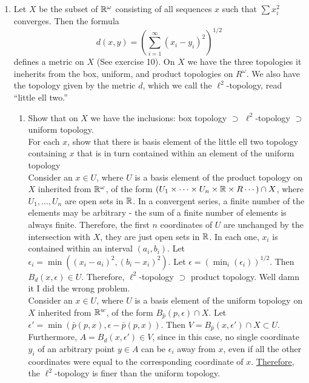 \documentclass[12pt,letterpaper]{article}
\begin{document}
\begin{enumerate}
  \item Let $X$ be the subset of $\mathbb{R}^\omega$ consisting of all sequences $x$ such that $\sum x_i^2$ converges. Then the formula $$d(x,y) = \left(\sum_{i=1}^\infty (x_i-y_i)^2\right)^{1/2}$$ defines a metric on $X$ (See exercise 10). On $X$ we have the three topologies it ineherits from the box, uniform, and product topologies on $R^\omega$. We also have the topology given by the metric $d$, which we call the $\ell^2$-topology, read ``little ell two.''
  \begin{enumerate}
    \item Show that on $X$ we have the inclusions: box topology $\supset$ $\ell^2$-topology $\supset$ uniform topology. \\
    For each $x$, show that there is basis element of the little ell two topology containing $x$ that is in turn contained within an element of the uniform topology \\
    Consider an $x\in U$, where $U$ is a basis element of the product topology on $X$ inherited from $\mathbb{R}^\omega$, of the form $(U_1\times\dots\times U_n\times \mathbb{R}\times R\cdots)\cap X$, where $U_1,\dots,U_n$ are open sets in $\mathbb{R}$.
    In a convergent series, a finite number of the elements may be arbitrary - the sum of a finite number of elements is always finite. Therefore, the first $n$ coordinates of $U$ are unchanged by the intersection with $X$, they are just open sets in $\mathbb{R}$. In each one, $x_i$ is contained within an interval $(a_i, b_i)$. Let $\epsilon_i = \min((x_i-a_i)^2, (b_i-x_i)^2)$. Let $\epsilon=(\min_i(\epsilon_i))^{1/2}$. Then $B_d(x,\epsilon)\in U$. Therefore, $\ell^2$-topology $\supset$ product topology. Well damn it I did the wrong problem.\\
    Consider an $x\in U$, where $U$ is a basis element of the uniform topology on $X$ inherited from $\mathbb{R}^w$, of the form $B_{\bar{p}}(p,\epsilon)\cap X$. Let $\epsilon' = \min(\bar{p}(p,x), \epsilon - \bar{p}(p,x))$. Then $V=B_{\bar{p}}(x,\epsilon')\cap X \subset U$. Furthermore, $A=B_d(x, \epsilon') \in V$, since in this case, no single coordinate $y_i$ of an arbitrary point $y\in A$ can be $\epsilon_i$ away from $x$, even if all the other coordinates were equal to the corresponding coordinate of $x$. \hyperref[thm:basisFiner]{Therefore}, the $\ell^2$-topology is finer than the uniform topology. \\

\end{enumerate}
\end{enumerate}
\end{document}
